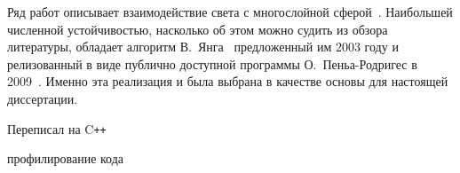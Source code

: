 Ряд работ описывает взаимодействие света с многослойной
сферой~\cite{Kai-94,Wu-97, Bhandari-85}.  Наибольшей численной
устойчивостью, насколько об этом можно судить из обзора литературы,
обладает алгоритм В.~Янга~\cite{Yang-2003} предложенный им 2003 году и
релизованный в виде публично доступной программы О.~Пеньа-Родригес в
2009~\cite{Pena-scattnlay-2009}. Именно эта реализация и была выбрана
в качестве основы для настоящей диссертации.


Переписал на C\texttt{++}






профилирование кода




\clearpage